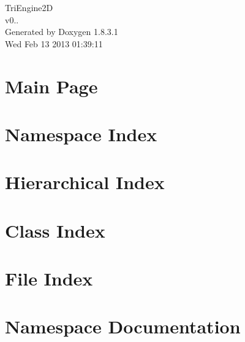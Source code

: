 \documentclass{book}
\begin{document}
\hypersetup{pageanchor=false,citecolor=blue}
\begin{titlepage}
\vspace*{7cm}
\begin{center}
{\Large Tri\-Engine2\-D \\[1ex]\large v0.. }\\
\vspace*{1cm}
{\large Generated by Doxygen 1.8.3.1}\\
\vspace*{0.5cm}
{\small Wed Feb 13 2013 01:39:11}\\
\end{center}
\end{titlepage}
\clearemptydoublepage
{}
\tableofcontents
\clearemptydoublepage
{}
\hypersetup{pageanchor=true,citecolor=blue}
\chapter{Main Page}
\label{index}\hypertarget{index}{}
\chapter{Namespace Index}

\chapter{Hierarchical Index}

\chapter{Class Index}

\chapter{File Index}

\chapter{Namespace Documentation}









\end{document}
